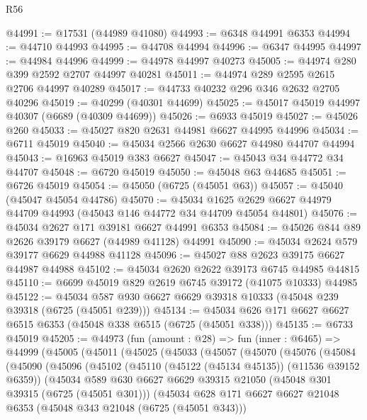 \begin{lexlean}{R56}
\begin{coremodule}
@44991 := @17531 (@44989 @41080)
@44993 := @6348 @44991 @6353
@44994 := @44710 @44993
@44995 := @44708 @44994
@44996 := @6347 @44995
@44997 := @44984 @44996
@44999 := @44978 @44997 @40273
@45005 := @44974 @280 @399 @2592 @2707 @44997 @40281
@45011 := @44974 @289 @2595 @2615 @2706 @44997 @40289
@45017 := @44733 @40232 @296 @346 @2632 @2705 @40296
@45019 := @40299 (@40301 @44699)
@45025 := @45017 @45019 @44997 @40307 (@6689 (@40309 @44699))
@45026 := @6933 @45019
@45027 := @45026 @260
@45033 := @45027 @820 @2631 @44981 @6627 @44995 @44996
@45034 := @6711 @45019
@45040 := @45034 @2566 @2630 @6627 @44980 @44707 @44994
@45043 := @16963 @45019 @383 @6627
@45047 := @45043 @34 @44772 @34 @44707
@45048 := @6720 @45019
@45050 := @45048 @63 @44685
@45051 := @6726 @45019
@45054 := @45050 (@6725 (@45051 @63))
@45057 := @45040 (@45047 @45054 @44786)
@45070 := @45034
    @1625
    @2629
    @6627
    @44979
    @44709
    @44993
    (@45043 @146 @44772 @34 @44709 @45054 @44801)
@45076 := @45034 @2627 @171 @39181 @6627 @44991 @6353
@45084 := @45026 @844 @89 @2626 @39179 @6627 (@44989 @41128) @44991
@45090 := @45034 @2624 @579 @39177 @6629 @44988 @41128
@45096 := @45027 @88 @2623 @39175 @6627 @44987 @44988
@45102 := @45034 @2620 @2622 @39173 @6745 @44985 @44815
@45110 := @6699 @45019 @829 @2619 @6745 @39172 (@41075 @10333) @44985
@45122 := @45034 @587 @930 @6627 @6629 @39318 @10333 (@45048 @239 @39318 (@6725 (@45051 @239)))
@45134 := @45034 @626 @171 @6627 @6627 @6515 @6353 (@45048 @338 @6515 (@6725 (@45051 @338)))
@45135 := @6733 @45019
@45205 := @44973
    (fun (amount : @28) =>
    fun (inner : @6465) =>
    @44999
      (@45005
        (@45011
          (@45025
            (@45033
              (@45057
                (@45070
                  (@45076
                    (@45084
                      (@45090
                        (@45096
                          (@45102
                            (@45110 (@45122 (@45134 @45135)) (@11536 @39152 @6359))
                            (@45034
                              @589
                              @630
                              @6627
                              @6629
                              @39315
                              @21050
                              (@45048 @301 @39315 (@6725 (@45051 @301)))
                              (@45034
                                @628
                                @171
                                @6627
                                @6627
                                @21048
                                @6353
                                (@45048 @343 @21048 (@6725 (@45051 @343)))

\end{coremodule}
\end{lexlean}
